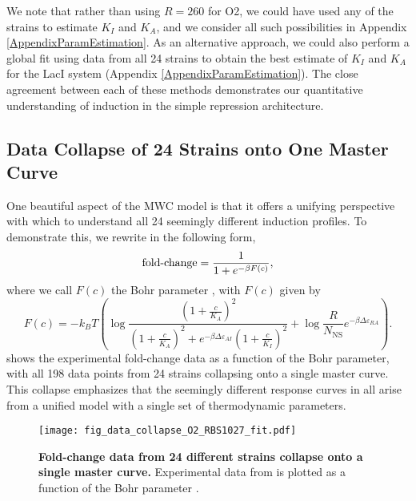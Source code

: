 We note that rather than using $R=260$ for O2, we could have used any of the strains to estimate $K_I$ and $K_A$, and we consider all such possibilities in Appendix \ref{AppendixParamEstimation}. As an alternative approach, we could also perform a global fit using data from all 24 strains to obtain the best estimate of $K_I$ and $K_A$ for the LacI system (Appendix \ref{AppendixParamEstimation}). The close agreement between each of these methods demonstrates our quantitative understanding of induction in the simple repression architecture.

\subsection*{Data Collapse of 24 Strains onto One Master Curve}

One beautiful aspect of the MWC model is that it offers a unifying perspective with which to understand all 24 seemingly different induction profiles. To demonstrate this, we rewrite \eref[eq7] in the following form,
\begin{equation}\label{eq8}
\operatorname{fold-change}= \frac{1}{1+e^{-\beta F(c)}} ,
\end{equation}
where we call $F(c)$ the Bohr parameter \cite{Phillips2016}, with $F(c)$ given by
\begin{equation}\label{eq10}
F(c) = - k_BT \left( \log \frac{\left(1+\frac{c}{K_A}\right)^2}{\left(1+\frac{c}{K_A}\right)^2+e^{-\beta  \Delta\varepsilon_{AI} }\left(1+\frac{c}{K_I}\right)^2} + \log \frac{R}{N_{\text{NS}}} e^{- \beta \Delta\varepsilon_{RA}} \right).
\end{equation}
 shows the experimental fold-change data as a function of the Bohr parameter, with all 198 data points from 24 strains collapsing onto a single master curve. This collapse emphasizes that the seemingly different response curves in  all arise from a unified model with a single set of thermodynamic parameters.

\begin{figure}[h!]
	\centering \texttt{[image: fig\_data\_collapse\_O2\_RBS1027\_fit.pdf]}
	\caption{{\bf Fold-change data from 24 different strains collapse onto a single master curve.} Experimental data from  is plotted as a function of the Bohr parameter \eref[eq10].} \label{fig_result3}
\end{figure}
